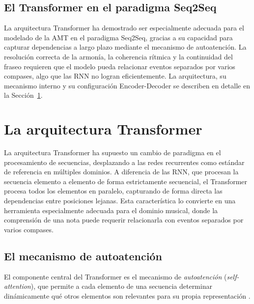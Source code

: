 \subsection{El Transformer en el paradigma Seq2Seq}

La arquitectura Transformer \cite{vaswani2017attention} ha demostrado
ser especialmente adecuada para el modelado de la AMT en el paradigma
Seq2Seq, gracias a su capacidad para capturar dependencias a largo plazo
mediante el mecanismo de autoatención. La resolución correcta de la
armonía, la coherencia rítmica y la continuidad del fraseo requieren que
el modelo pueda relacionar eventos separados por varios compases, algo
que las RNN no logran eficientemente. La arquitectura, su mecanismo
interno y su configuración Encoder-Decoder se describen en detalle en la
Sección~\ref{sec:transformer}.


\section{La arquitectura Transformer}
\label{sec:transformer}

La arquitectura Transformer \cite{vaswani2017attention} ha supuesto un
cambio de paradigma en el procesamiento de secuencias, desplazando a las
redes recurrentes como estándar de referencia en múltiples dominios. A
diferencia de las RNN, que procesan la secuencia elemento a elemento de
forma estrictamente secuencial, el Transformer procesa todos los elementos
en paralelo, capturando de forma directa las dependencias entre posiciones
lejanas. Esta característica lo convierte en una herramienta especialmente
adecuada para el dominio musical, donde la comprensión de una nota puede
requerir relacionarla con eventos separados por varios compases.

\subsection{El mecanismo de autoatención}

El componente central del Transformer es el mecanismo de
\textit{autoatención} (\textit{self-attention}), que permite a cada
elemento de una secuencia determinar dinámicamente qué otros elementos
son relevantes para su propia representación \cite{vaswani2017attention}.

